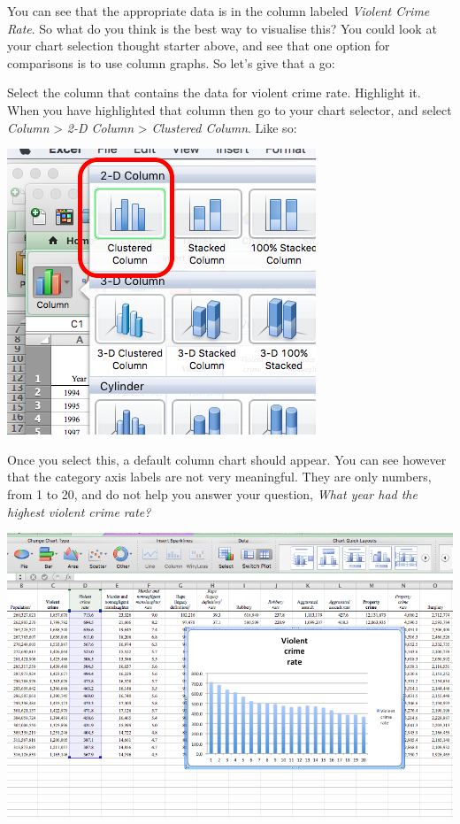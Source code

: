 \documentclass[
]{book}
\begin{document}
You can see that the appropriate data is in the column labeled \emph{Violent Crime Rate}. So what do you think is the best way to visualise this? You could look at your chart selection thought starter above, and see that one option for comparisons is to use column graphs. So let's give that a go:

Select the column that contains the data for violent crime rate. Highlight it. When you have highlighted that column then go to your chart selector, and select \emph{Column} \textgreater{} \emph{2-D Column} \textgreater{} \emph{Clustered Column}. Like so:

\includegraphics{imgs/desc_viz_1.png}

Once you select this, a default column chart should appear. You can see however that the category axis labels are not very meaningful. They are only numbers, from 1 to 20, and do not help you answer your question, \emph{What year had the highest violent crime rate?}

\includegraphics{imgs/desc_viz_2.png}
\end{document}
